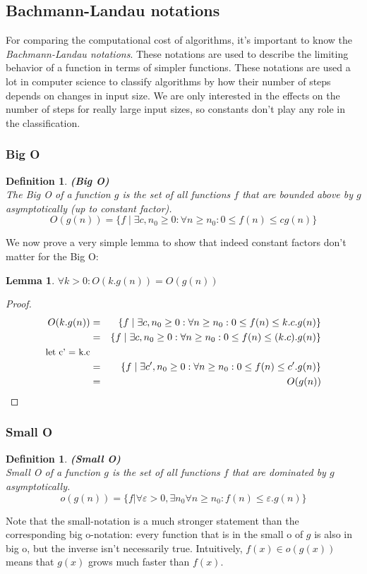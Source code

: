 \documentclass[a4paper,11pt]{report}
\newtheorem{lemma}[theorem]{Lemma}
\newtheorem{definition}[theorem]{Definition}
\begin{document}
\subsection{Bachmann-Landau notations}
For comparing the computational cost of algorithms, 
it's important to know the \emph{Bachmann-Landau notations}. These notations are used to describe the limiting behavior of a function in terms of simpler functions. 
These notations are used a lot in computer science to classify algorithms by how their number of steps depends on changes in input size. 
We are only interested in the effects on the number of steps for really large input sizes, so constants don't play any role in the classification.

\subsubsection{Big O}\begin{definition}\textbf{(Big O)}\\
The Big O of a function $g$ is the set of all functions $f$ that are bounded above by $g$ asymptotically (up to constant factor).
$$O(g(n)) = \{f\mid\exists c, n_0 \geq 0: \forall n \geq n_0 : 0 \leq f(n) \leq cg(n)\}$$
\end{definition}
We now prove a very simple lemma to show that indeed constant factors don't matter for the Big O:
\begin{lemma}\label{constanten}
$\forall k > 0: O(k.g(n)) = O(g(n))$
\end{lemma}

\begin{proof}
\begin{eqnarray*}
O(k.g(n)) &=& \{f\mid\exists c, n_0 \geq 0: \forall n \geq n_0 : 0 \leq f(n) \leq k.c.g(n)\}\\
&=& \{f\mid\exists c, n_0 \geq 0: \forall n \geq n_0 : 0 \leq f(n) \leq (k.c).g(n)\}\\
\text{\small{let c' = k.c}}\\
&=& \{f\mid\exists c', n_0 \geq 0: \forall n \geq n_0 : 0 \leq f(n) \leq c'.g(n)\}\\
&=& O(g(n))
\end{eqnarray*}
\end{proof}



\subsubsection{Small O}
\begin{definition}\textbf{(Small O)}\\
Small O of a function $g$ is the set of all functions $f$ that are dominated by $g$ asymptotically.
$$o(g(n)) = \{f|\forall \varepsilon > 0, \exists n_0 \forall n \geq n_0: f(n) \leq \varepsilon.g(n)\}$$
\end{definition}
Note that the small-notation is a much stronger statement than the corresponding big o-notation: every function that is in the small o of $g$ is also in big o, but the inverse isn't necessarily true. Intuitively, $f(x) \in o(g(x))$ means that $g(x)$ grows much faster than $f(x)$.
\end{document}
